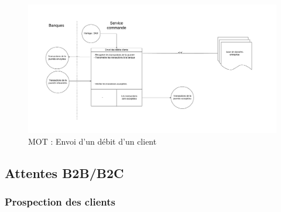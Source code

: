 \begin{landscape}
  \begin{figure}[ht!]
      \centering
      \includegraphics[width=0.7\paperheight]{mot-envoie-debit-client}
      \caption{MOT : Envoi d'un débit d'un client}
      \label{fig:mot-envoie-debit-client}
  \end{figure}
\end{landscape}

\subsection{Attentes B2B/B2C}

\subsubsection{Prospection des clients}

